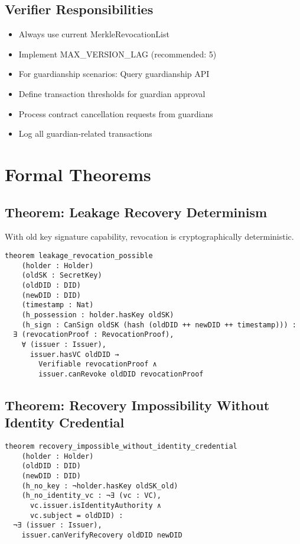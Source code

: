 \subsection{Verifier Responsibilities}

\begin{itemize}
  \item Always use current MerkleRevocationList
  \item Implement MAX\_VERSION\_LAG (recommended: 5)
  \item For guardianship scenarios: Query guardianship API
  \item Define transaction thresholds for guardian approval
  \item Process contract cancellation requests from guardians
  \item Log all guardian-related transactions
\end{itemize}

\section{Formal Theorems}

\subsection{Theorem: Leakage Recovery Determinism}

With old key signature capability, revocation is cryptographically deterministic.

\begin{lstlisting}[language=Lean]
theorem leakage_revocation_possible
    (holder : Holder)
    (oldSK : SecretKey)
    (oldDID : DID)
    (newDID : DID)
    (timestamp : Nat)
    (h_possession : holder.hasKey oldSK)
    (h_sign : CanSign oldSK (hash (oldDID ++ newDID ++ timestamp))) :
  ∃ (revocationProof : RevocationProof),
    ∀ (issuer : Issuer),
      issuer.hasVC oldDID →
        Verifiable revocationProof ∧
        issuer.canRevoke oldDID revocationProof
\end{lstlisting}

\subsection{Theorem: Recovery Impossibility Without Identity Credential}

\begin{lstlisting}[language=Lean]
theorem recovery_impossible_without_identity_credential
    (holder : Holder)
    (oldDID : DID)
    (newDID : DID)
    (h_no_key : ¬holder.hasKey oldSK_old)
    (h_no_identity_vc : ¬∃ (vc : VC),
      vc.issuer.isIdentityAuthority ∧
      vc.subject = oldDID) :
  ¬∃ (issuer : Issuer),
    issuer.canVerifyRecovery oldDID newDID
\end{lstlisting}

